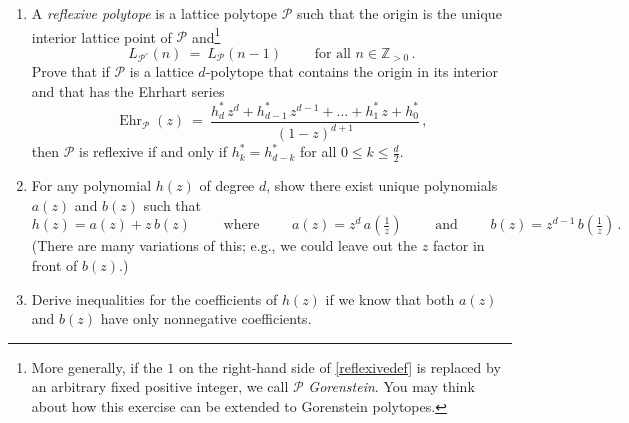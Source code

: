 \documentclass[11pt]{article}
\def\cP{\mathcal{P}}
\def\ZZ{\mathbb{Z}}
\newcommand\Ehr{\operatorname{Ehr}}
\begin{document}
\begin{enumerate}[(1)]
\item A \emph{reflexive polytope}
is a lattice polytope $\cP$ such that the origin is the unique interior lattice point of
$\cP$ and\footnote{More generally, if the $1$ on the right-hand side of \eqref{reflexivedef}
is replaced by an arbitrary fixed positive integer, we call $\cP$ \emph{Gorenstein}. You may
think about how this exercise can be extended to Gorenstein polytopes.}
\begin{equation}\label{reflexivedef}
  L_{ \cP^\circ } (n) \ = \ L_\cP (n-1)
  \qquad \text{ for all } n \in \ZZ_{ >0 }  \, .
\end{equation}
Prove that if $\cP$ is a lattice $d$-polytope that contains the origin in its interior and that has the Ehrhart series
\[
  \Ehr_\cP(z) \ = \ \frac{ h^*_d \, z^d + h^*_{ d-1 } \, z^{ d-1 } + \dots + h^*_1 \, z + h^*_0 }{ (1-z)^{ d+1 } } \, ,
\]
then $\cP$ is reflexive if and only if $ h^*_k = h^*_{ d-k }$ for all $0 \le k
\le \frac d 2$.

\item For any polynomial $h(z)$ of degree $d$, show there exist unique polynomials $a(z)$ and $b(z)$ such that
\[
  h(z) = a(z) + z \, b(z)
  \qquad \text{ where } \qquad a(z) = z^d \, a(\tfrac 1 z) \qquad \text{ and } \qquad b(z) = z^{ d-1 } \, b(\tfrac 1 z) \, .
\]
(There are many variations of this; e.g., we could leave out the $z$ factor in front of $b(z)$.)

\item Derive inequalities for the coefficients of $h(z)$ if we know that both $a(z)$ and $b(z)$ have only nonnegative
coefficients.


\end{enumerate}
\end{document}
